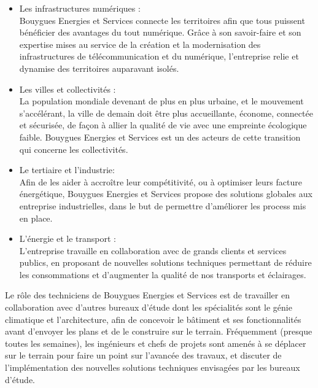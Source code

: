 \documentclass[a4paper]{article}
\begin{document}
    \begin{itemize}

    \item Les infrastructures numériques : \\
        
        Bouygues Energies et Services connecte les territoires afin que tous puissent bénéficier des avantages du tout numérique. Grâce à son savoir-faire et son expertise mises au service de la création et la modernisation des infrastructures de télécommunication et du numérique, l'entreprise relie et dynamise des territoires auparavant isolés. \\

    \item Les villes et collectivités : \\

        La population mondiale devenant de plus en plus urbaine, et le mouvement s'accélérant, la ville de demain doit être plus accueillante, économe, connectée et sécurisée, de façon à allier la qualité de vie avec une empreinte écologique faible. Bouygues Energies et Services est un des acteurs de cette transition qui concerne les collectivités. \\

    \item Le tertiaire et l'industrie: \\

        Afin de les aider à accroître leur compétitivité, ou à optimiser leurs facture énergétique, Bouygues Energies et Services propose des solutions globales aux entreprise industrielles, dans le but de permettre d'améliorer les process mis en place. \\

    \item L'énergie et le transport : \\

        L'entreprise travaille en collaboration avec de grands clients et services publics, en proposant de nouvelles solutions techniques permettant de réduire les consommations et d'augmenter la qualité de nos transports et éclairages. 

    \end{itemize}
    \vspace{5pt}
    
    Le rôle des techniciens de Bouygues Energies et Services est de travailler en collaboration avec d’autres bureaux d’étude dont les spécialités sont le génie climatique et l’architecture, afin de concevoir le bâtiment et ses fonctionnalités avant d’envoyer les plans et de le construire sur le terrain. Fréquemment (presque toutes les semaines), les ingénieurs et chefs de projets sont amenés à se déplacer sur le terrain pour faire un point sur l’avancée des travaux, et discuter de l'implémentation des nouvelles solutions techniques envisagées par les bureaux d'étude. \\
 
\end{document}
